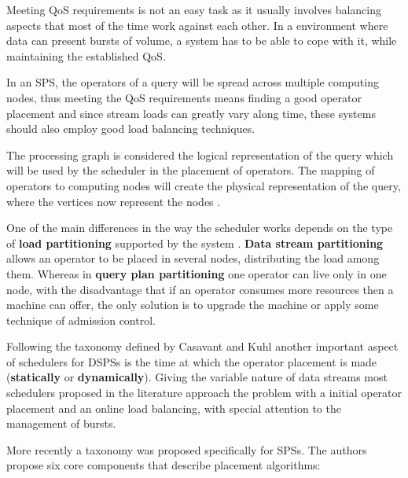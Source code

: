 \documentclass[ppgc,diss,english]{iiufrgs}
\begin{document}
Meeting QoS requirements is not an easy task as it usually involves balancing aspects that most of the time work against each other. In a environment where data can present bursts of volume, a system has to be able to cope with it, while maintaining the established QoS.

In an SPS, the operators of a query will be spread across multiple computing nodes, thus meeting the QoS requirements means finding a good operator placement and since stream loads can greatly vary along time, these systems should also employ good load balancing techniques.


The processing graph is considered the logical representation of the query which will be used by the scheduler in the placement of operators. The mapping of operators to computing nodes will create the physical representation of the query, where the vertices now represent the nodes \cite{kossmann2000state, lei2012robust}.

One of the main differences in the way the scheduler works depends on the type of \textbf{load partitioning} supported by the system \cite{johnson2008query}. \textbf{Data stream partitioning} allows an operator to be placed in several nodes, distributing the load among them. Whereas in \textbf{query plan partitioning} one operator can live only in one node, with the disadvantage that if an operator consumes more resources then a machine can offer, the only solution is to upgrade the machine or apply some technique of admission control.

Following the taxonomy defined by Casavant and Kuhl \cite{casavant1988taxonomy} another important aspect of schedulers for DSPSs is the time at which the operator placement is made (\textbf{statically} or \textbf{dynamically}). Giving the variable nature of data streams most schedulers proposed in the literature approach the problem with a initial operator placement and an online load balancing, with special attention to the management of bursts.

More recently a taxonomy was proposed \cite{lakshmanan2008placement} specifically for SPSs. The authors propose six core components that describe placement algorithms:
\end{document}
